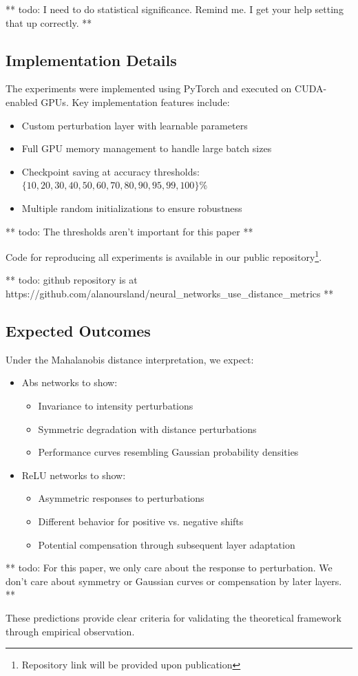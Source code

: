 ** todo: I need to do statistical significance. Remind me. I get your help setting that up correctly. ** 

\subsection{Implementation Details}

The experiments were implemented using PyTorch and executed on CUDA-enabled GPUs. Key implementation features include:
\begin{itemize}
    \item Custom perturbation layer with learnable parameters
    \item Full GPU memory management to handle large batch sizes
    \item Checkpoint saving at accuracy thresholds: $\{10, 20, 30, 40, 50, 60, 70, 80, 90, 95, 99, 100\}$\%
    \item Multiple random initializations to ensure robustness
\end{itemize}

** todo: The thresholds aren't important for this paper **

Code for reproducing all experiments is available in our public repository\footnote{Repository link will be provided upon publication}.

** todo: github repository is at https://github.com/alanoursland/neural_networks_use_distance_metrics **

\subsection{Expected Outcomes}

Under the Mahalanobis distance interpretation, we expect:
\begin{itemize}
    \item Abs networks to show:
        \begin{itemize}
            \item Invariance to intensity perturbations
            \item Symmetric degradation with distance perturbations
            \item Performance curves resembling Gaussian probability densities
        \end{itemize}
    \item ReLU networks to show:
        \begin{itemize}
            \item Asymmetric responses to perturbations
            \item Different behavior for positive vs. negative shifts
            \item Potential compensation through subsequent layer adaptation
        \end{itemize}
\end{itemize}

** todo: For this paper, we only care about the response to perturbation. We don't care about symmetry or Gaussian curves or compensation by later layers. **

These predictions provide clear criteria for validating the theoretical framework through empirical observation.